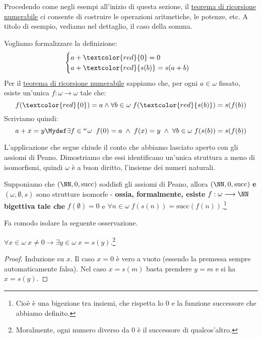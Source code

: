 \documentclass[11pt]{scrartcl}
\begin{document}
Procedendo come negli esempi all'inizio di questa sezione, il \hyperref[ric1]{teorema di ricorsione numerabile} ci consente di costruire le operazioni aritmetiche, le potenze, etc.
A titolo di esempio, vediamo nel dettaglio, il caso della somma.

\begin{example}
	Vogliamo formalizzare la definizione:
	\[ \begin{cases}
		a + \textcolor{red}{0} = 0\\
		a + \textcolor{red}{s(b)} = s(a+b)
	\end{cases}
		\]
	Per il \hyperref[ric1]{teorema di ricorsione numerabile} sappiamo che, per ogni $a \in \omega$ fissato, esiste un'unica $f : \omega \rightarrow \omega$ tale che:
	\[ f(\textcolor{red}{0}) = a \land \forall b \in \omega \; f(\textcolor{red}{s(b)}) = s(f(b))
		\]
	Scriviamo quindi:
	\[ a + x = y \Mydef \exists f \in {}^{\omega}\omega \;\; f(0) = a \; \land  \; f(x) = y \; \land \; \forall b \in \omega \; f(s(b)) = s(f(b))
		\]
\end{example}

L'applicazione che segue chiude il conto che abbiamo lasciato aperto con gli assiomi di Peano. Dimostriamo che essi identificano un'unica struttura a meno di isomorfismi, quindi $\omega$ è 
a buon diritto, l'insieme dei numeri naturali.

\begin{theorem}
	Supponiamo che $(\NN, 0, \text{succ})$ soddisfi gli assiomi di Peano, allora $(\NN, 0, \text{succ})$ \textbf{e} $(\omega,\emptyset,s)$ sono strutture isomorfe - \textbf{ossia, formalmente, esiste} $f : \omega \longrightarrow \NN$ 
	\textbf{bigettiva tale che} $f(\emptyset) = 0$ e $\forall n \in \omega \; f(s(n)) = \text{succ}(f(n))$.\footnote{Cioè è una bigezione tra insiemi, che rispetta lo 0 e la funzione successore che abbiamo definito.}
\end{theorem}

Fa comodo isolare la seguente osservazione.

\begin{remark}
	$\forall x \in \omega \; x \ne 0 \rightarrow \exists y \in \omega \; x = s(y)$.\footnote{Moralmente, ogni numero diverso da 0 è il successore di qualcos'altro.}
\end{remark}

\begin{proof}
	Induzione su $x$. Il caso $x = 0$ è vero a vuoto (essendo la premessa sempre automaticamente falsa). Nel caso $x = s(m)$ basta prendere $y = m$ e si ha $x = s(y)$.
\end{proof}
\end{document}
